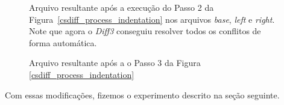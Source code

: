 \begin{figure}[ht]
	\begin{center}
		
		\caption{Arquivo resultante após a execução do Passo 2 da Figura~\ref{csdiff_process_indentation} nos arquivos
			\emph{base}, \emph{left} e \emph{right}. Note que agora o \emph{Diff3} conseguiu resolver todos
			os conflitos de forma automática.
		}\label{diff3_marcadores_indentacao}
	\end{center}
\end{figure}

\begin{figure}[ht]
	\begin{center}
        
		\caption{Arquivo resultante após a o Passo 3 da Figura
			\ref{csdiff_process_indentation}}\label{csdiff_indentacao}
	\end{center}
\end{figure}

Com essas modificações, fizemos o experimento descrito na seção seguinte.
